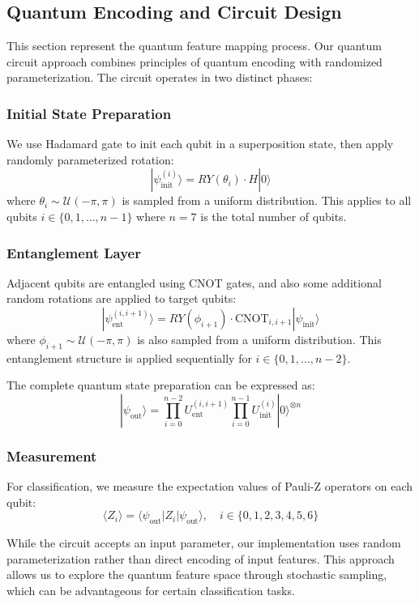 \documentclass[conference]{IEEEtran}
\begin{document}
\subsection{Quantum Encoding and Circuit Design}
This section represent the quantum feature mapping process. Our quantum circuit approach combines principles of quantum encoding with randomized parameterization. The circuit operates in two distinct phases:

\subsubsection{Initial State Preparation}
We use Hadamard gate to init each qubit in a superposition state, then apply randomly parameterized rotation:
\[
    |\psi_{\text{init}}^{(i)}\rangle = RY(\theta_i) \cdot H |0\rangle
\]
where $\theta_i \sim \mathcal{U}(-\pi, \pi)$ is sampled from a uniform distribution. This applies to all qubits $i \in \{0, 1, \ldots, n-1\}$ where $n=7$ is the total number of qubits.

\subsubsection{Entanglement Layer}
Adjacent qubits are entangled using CNOT gates, and also some additional random rotations are applied to target qubits:
\[
    |\psi_{\text{ent}}^{(i,i+1)}\rangle = RY(\phi_{i+1}) \cdot \text{CNOT}_{i,i+1} |\psi_{\text{init}}\rangle
\]
where $\phi_{i+1} \sim \mathcal{U}(-\pi, \pi)$ is also sampled from a uniform distribution. This entanglement structure is applied sequentially for $i \in \{0, 1, \ldots, n-2\}$.

The complete quantum state preparation can be expressed as:
\[
    |\psi_{\text{out}}\rangle = \prod_{i=0}^{n-2} U_{\text{ent}}^{(i,i+1)} \prod_{i=0}^{n-1} U_{\text{init}}^{(i)} |0\rangle^{\otimes n}
\]

\subsubsection{Measurement}
For classification, we measure the expectation values of Pauli-Z operators on each qubit:
\[
    \langle Z_i \rangle = \langle\psi_{\text{out}}|Z_i|\psi_{\text{out}}\rangle, \quad i \in \{0,1,2,3,4,5,6\}
\]

While the circuit accepts an input parameter, our implementation uses random parameterization rather than direct encoding of input features. This approach allows us to explore the quantum feature space through stochastic sampling, which can be advantageous for certain classification tasks.
\end{document}
